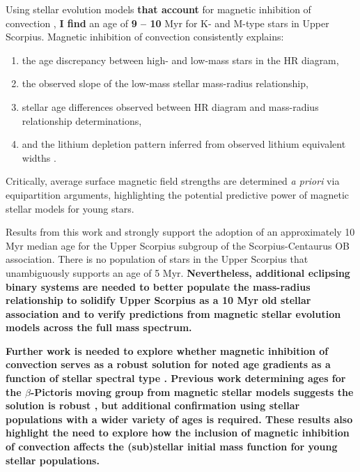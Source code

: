 \documentclass{aa}
\begin{document}
Using stellar evolution models {\bf that account} for magnetic inhibition of convection \citep{FC12b, FC13}, {\bf I find} an age of {\bf 9 -- 10} Myr for K- and M-type stars in Upper Scorpius. Magnetic inhibition of convection consistently explains:
\begin{enumerate} 
	\item the age discrepancy between high- and low-mass stars in the HR diagram,
	\item the observed slope of the low-mass stellar mass-radius relationship,
	\item stellar age differences observed between HR diagram and mass-radius relationship determinations,
	\item and the lithium depletion pattern inferred from observed lithium equivalent widths \citep{Rizzuto2015}. 
\end{enumerate}
Critically, average surface magnetic field strengths are determined \emph{a priori} via equipartition arguments, highlighting the potential predictive power of magnetic stellar models for young stars.

Results from this work and \citet{Pecaut2012} strongly support the adoption of an approximately 10 Myr median age for the Upper Scorpius subgroup of the Scorpius-Centaurus OB association. There is no population of stars in the Upper Scorpius that unambiguously supports an age of 5 Myr. {\bf Nevertheless, additional eclipsing binary systems are needed to better populate the mass-radius relationship to solidify Upper Scorpius as a 10 Myr old stellar association and to verify predictions from magnetic stellar evolution models across the full mass spectrum.}

{\bf Further work is needed to explore whether magnetic inhibition of convection serves as a robust solution for noted age gradients as a function of stellar spectral type \citep[e.g.,][]{Naylor2009, Herczeg2015}. Previous work determining ages for the $\beta$-Pictoris moving group from magnetic stellar models suggests the solution is robust \citep{MM10, Malo2014, Binks2016}, but additional confirmation using stellar populations with a wider variety of ages is required. These results also highlight the need to explore how the inclusion of magnetic inhibition of convection affects the (sub)stellar initial mass function for young stellar populations.}
\end{document}

